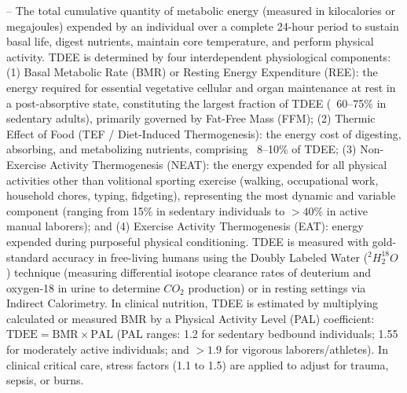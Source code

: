 -- The total cumulative quantity of metabolic energy (measured in kilocalories or megajoules) expended by an individual over a complete 24-hour period to sustain basal life, digest nutrients, maintain core temperature, and perform physical activity. TDEE is determined by four interdependent physiological components: (1) Basal Metabolic Rate (BMR) or Resting Energy Expenditure (REE): the energy required for essential vegetative cellular and organ maintenance at rest in a post-absorptive state, constituting the largest fraction of TDEE (~60--75\% in sedentary adults), primarily governed by Fat-Free Mass (FFM); (2) Thermic Effect of Food (TEF / Diet-Induced Thermogenesis): the energy cost of digesting, absorbing, and metabolizing nutrients, comprising ~8--10\% of TDEE; (3) Non-Exercise Activity Thermogenesis (NEAT): the energy expended for all physical activities other than volitional sporting exercise (walking, occupational work, household chores, typing, fidgeting), representing the most dynamic and variable component (ranging from 15\% in sedentary individuals to $>40\%$ in active manual laborers); and (4) Exercise Activity Thermogenesis (EAT): energy expended during purposeful physical conditioning. TDEE is measured with gold-standard accuracy in free-living humans using the Doubly Labeled Water ($^2H_2^{18}O$) technique (measuring differential isotope clearance rates of deuterium and oxygen-18 in urine to determine $CO_2$ production) or in resting settings via Indirect Calorimetry. In clinical nutrition, TDEE is estimated by multiplying calculated or measured BMR by a Physical Activity Level (PAL) coefficient: $\text{TDEE} = \text{BMR} \times \text{PAL}$ (PAL ranges: 1.2 for sedentary bedbound individuals; 1.55 for moderately active individuals; and $>1.9$ for vigorous laborers/athletes). In clinical critical care, stress factors (1.1 to 1.5) are applied to adjust for trauma, sepsis, or burns.

